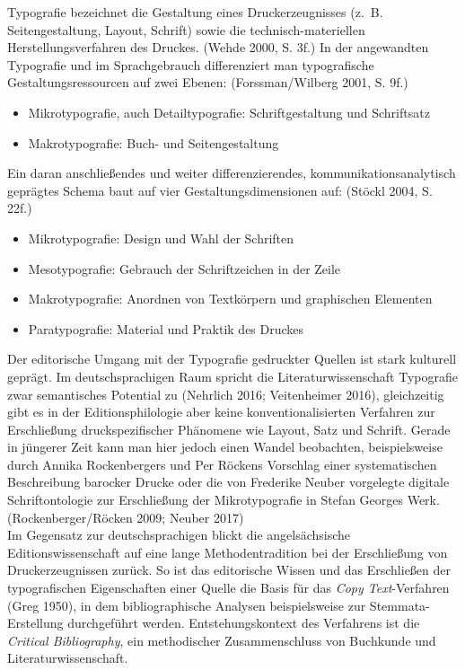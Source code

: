 \documentclass{article}
\begin{document}
    Typografie bezeichnet die Gestaltung eines Druckerzeugnisses (z. B. Seitengestaltung, Layout, Schrift) sowie die technisch-materiellen Herstellungsverfahren des Druckes. (Wehde 2000, S. 3f.) In der angewandten Typografie und im Sprachgebrauch differenziert man typografische Gestaltungsressourcen auf zwei Ebenen: (Forssman/Wilberg 2001, S. 9f.)\\
            
        \begin{itemize}\item {Mikrotypografie, auch Detailtypografie: Schriftgestaltung und Schriftsatz}\item {Makrotypografie: Buch- und Seitengestaltung}\end{itemize}Ein daran anschließendes und weiter differenzierendes, kommunikationsanalytisch geprägtes Schema baut auf vier Gestaltungsdimensionen auf: (Stöckl 2004, S. 22f.)\\
            
        \begin{itemize}\item {Mikrotypografie: Design und Wahl der Schriften}\item {Mesotypografie: Gebrauch der Schriftzeichen in der Zeile}\item {Makrotypografie: Anordnen von Textkörpern und graphischen Elementen}\item {Paratypografie: Material und Praktik des Druckes}\end{itemize}Der editorische Umgang mit der Typografie gedruckter Quellen ist stark kulturell geprägt. Im deutschsprachigen Raum spricht die Literaturwissenschaft Typografie zwar semantisches Potential zu (Nehrlich 2016; Veitenheimer 2016), gleichzeitig gibt es in der Editionsphilologie aber keine konventionalisierten Verfahren zur Erschließung druckspezifischer Phänomene wie Layout, Satz und Schrift. Gerade in jüngerer Zeit kann man hier jedoch einen Wandel beobachten, beispielsweise durch Annika Rockenbergers und Per Röckens Vorschlag einer systematischen Beschreibung barocker Drucke oder die von Frederike Neuber vorgelegte digitale Schriftontologie zur Erschließung der Mikrotypografie in Stefan Georges Werk. (Rockenberger/Röcken 2009; Neuber 2017)\\
            
        Im Gegensatz zur deutschsprachigen blickt die angelsächsische Editionswissenschaft auf eine lange Methodentradition bei der Erschließung von Druckerzeugnissen zurück. So ist das editorische Wissen und das Erschließen der typografischen Eigenschaften einer Quelle die Basis für das \emph{Copy Text}-Verfahren (Greg 1950), in dem bibliographische Analysen beispielsweise zur Stemmata-Erstellung durchgeführt werden. Entstehungskontext des Verfahrens ist die \emph{Critical Bibliography}, ein methodischer Zusammenschluss von Buchkunde und Literaturwissenschaft.\\
            
\end{document}
